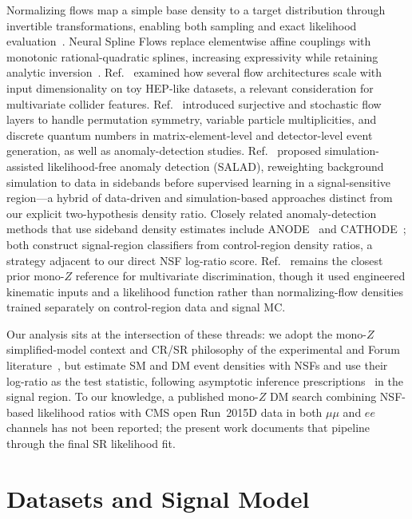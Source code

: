 \documentclass[11pt,a4paper,twocolumn]{article}
\begin{document}
Normalizing flows map a simple base density to a target distribution through invertible
transformations, enabling both sampling and exact likelihood evaluation~\cite{Papamakarios2021}.
Neural Spline Flows replace elementwise affine couplings with monotonic rational-quadratic
splines, increasing expressivity while retaining analytic inversion~\cite{Durkan2019}.
Ref.~\cite{Reyes2022} examined how several flow architectures scale with input
dimensionality on toy HEP-like datasets, a relevant consideration for multivariate collider
features.
Ref.~\cite{Verheyen2022} introduced surjective and stochastic flow layers to handle
permutation symmetry, variable particle multiplicities, and discrete quantum numbers in
matrix-element-level and detector-level event generation, as well as anomaly-detection
studies.
Ref.~\cite{Andreassen2020} proposed simulation-assisted likelihood-free anomaly detection
(SALAD), reweighting background simulation to data in sidebands before supervised
learning in a signal-sensitive region---a hybrid of data-driven and simulation-based
approaches distinct from our explicit two-hypothesis density ratio.
Closely related anomaly-detection methods that use sideband density estimates include
ANODE~\cite{Nachman2020} and CATHODE~\cite{Hallin2021}; both construct signal-region
classifiers from control-region density ratios, a strategy adjacent to our direct NSF
log-ratio score.
Ref.~\cite{Alves2015} remains the closest prior mono-$Z$ reference for multivariate
discrimination, though it used engineered kinematic inputs and a likelihood function rather
than normalizing-flow densities trained separately on control-region data and signal MC.

Our analysis sits at the intersection of these threads: we adopt the mono-$Z$ simplified-model
context and CR/SR philosophy of the experimental and Forum literature~\cite{DMForum2015,CMS2021MonoZ},
but estimate SM and DM event densities with NSFs and use their log-ratio as the test
statistic, following asymptotic inference prescriptions~\cite{Cowan2011} in the signal region.
To our knowledge, a published mono-$Z$ DM search combining NSF-based likelihood ratios with
CMS open Run~2015D data in both $\mu\mu$ and $ee$ channels has not been reported; the
present work documents that pipeline through the final SR likelihood fit.

\section{Datasets and Signal Model}
\label{sec:datasets}
\end{document}

